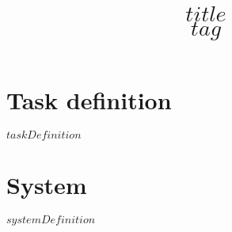 \documentclass[a4paper,10pt,bibtotoc]{scrartcl}
\title{$title$\\$tag$}
\begin{document}

\maketitle

\begin{multicols}{2}

\tableofcontents


\section{Task definition}
$taskDefinition$

\section{System}
$systemDefinition$

% 
% 

\end{multicols}
\end{document}
